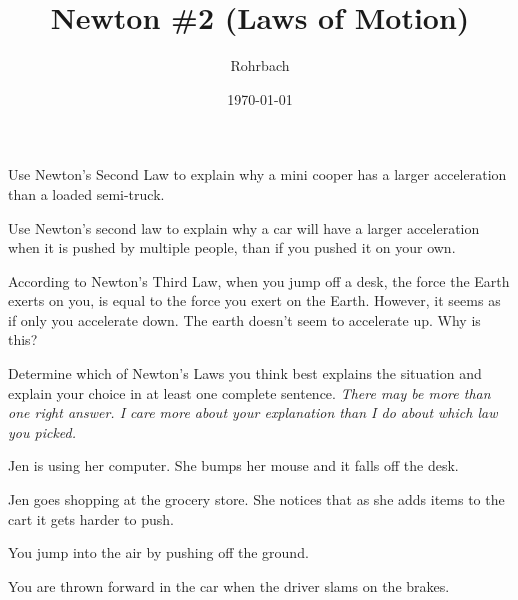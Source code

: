 \documentclass[10pt]{exam}
\title{Newton \#2 (Laws of Motion)}
\author{Rohrbach}
\date{\today}
\begin{document}
\maketitle

\begin{questions}
  
    \question
      Use Newton's Second Law to explain why a mini cooper has a larger acceleration than a loaded semi-truck.
      \vs
    
    \question
      Use Newton's second law to explain why a car will have a larger acceleration when it is pushed by multiple people, than if you pushed it on your own.
      \vs
    
    
    \question 
      According to Newton's Third Law, when you jump off a desk, the force the Earth exerts on you, is equal to the force you exert on the Earth.  However, it seems as if only you accelerate down.  The earth doesn't seem to accelerate up.  Why is this?
      \vs
  
  
  \begin{EnvUplevel}
    Determine which of Newton's Laws you think best explains the situation and explain your choice in at least one complete sentence.  \it There may be more than one right answer.  I care more about your explanation than I do about which law you picked.
  \end{EnvUplevel}
  
    \question 
      Jen is using her computer. She bumps her mouse and it falls off the desk.
      \vs
  
    \question
      Jen goes shopping at the grocery store. She notices that as she adds items to the cart it gets harder to push.
      \vs
    
    \question
      You jump into the air by pushing off the ground.
      \vs
  
    \question
      You are thrown forward in the car when the driver slams on the brakes.
      \vs
  

\end{questions}
\end{document}
